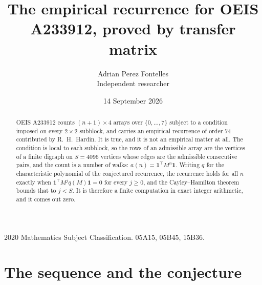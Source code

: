 \documentclass[11pt,a4paper]{article}
\title{The empirical recurrence for OEIS A233912, proved by transfer matrix}
\author{Adrian Perez Fontelles\\ \small Independent researcher}
\date{14 September 2026}
\theoremstyle{plain}
\theoremstyle{definition}
\begin{document}
\maketitle

\begin{abstract}
OEIS A233912 counts $(n+1)\times4$ arrays over $\{0,\dots,7\}$ subject to a condition imposed on
every $2\times2$ subblock, and carries an empirical recurrence of order $74$ contributed
by R.~H.~Hardin. It is true, and it is not an empirical matter at all. The condition is local
to each subblock, so the rows of an admissible array are the vertices of a finite digraph
on $S=4096$ vertices whose edges are the admissible consecutive pairs, and the count is a
number of walks: $a(n)=\mathbf{1}^{\!\top}M^{n}\mathbf{1}$. Writing $q$
for the characteristic polynomial of the conjectured recurrence, the recurrence holds for all
$n$ exactly when $\mathbf{1}^{\!\top}M^{j}q(M)\mathbf{1}=0$ for every $j\ge0$, and the
Cayley--Hamilton theorem bounds that to $j<S$. It is therefore a finite computation in exact
integer arithmetic, and it comes out zero.
\end{abstract}

\noindent\small 2020 Mathematics Subject Classification. 05A15, 05B45, 15B36.\normalsize

\section{The sequence and the conjecture}
\end{document}

